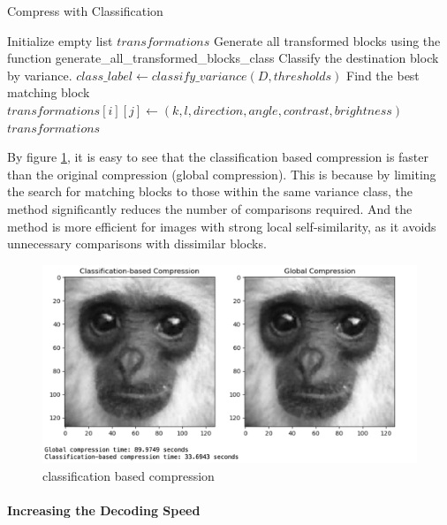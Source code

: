 \documentclass[a4paper,11pt, titlepage]{article}
\theoremstyle{definition}
\theoremstyle{plain}
\theoremstyle{remark}
\theoremstyle{definition}
\begin{document}
\begin{algorithm}
\caption{Compress with Classification}
\begin{algorithmic}[1]
\STATE Initialize empty list $transformations$
\STATE Generate all transformed blocks using the function generate\_all\_transformed\_blocks\_class
    \STATE Classify the destination block by variance.
    \STATE $class\_label \gets classify\_variance(D, thresholds)$
        \STATE Find the best matching block
        \STATE $transformations[i][j] \gets (k, l, direction, angle, contrast, brightness)$
    \ENDFOR
\ENDFOR
\RETURN $transformations$
\end{algorithmic}
\end{algorithm}


By figure \ref{fig:classification_based_compress}, it is easy to see that the classification based compression is faster than the original compression (global compression). 
This is because by limiting the search for matching blocks to those within the same variance class, the method significantly reduces the number of comparisons required. And the method is more efficient for images with strong local self-similarity, as it avoids unnecessary comparisons with dissimilar blocks.

\begin{figure}[H]
    \centering
    \includegraphics[width=\textwidth]{classification_based_compress.png}
    \caption{classification based compression}
    \label{fig:classification_based_compress}
\end{figure}

\paragraph{Increasing the Decoding Speed}
\end{document}
